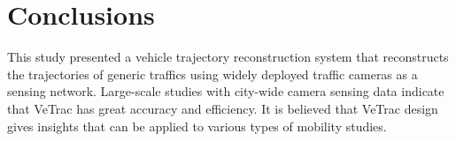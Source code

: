 \section{Conclusions}
\label{sec:conclusions}

This study presented a vehicle trajectory reconstruction system that reconstructs the trajectories of generic traffics using widely deployed traffic cameras as a sensing network.
Large-scale studies with city-wide camera sensing data indicate that VeTrac has great accuracy and efficiency.
It is believed that VeTrac design gives insights that can be applied to various types of mobility studies.
